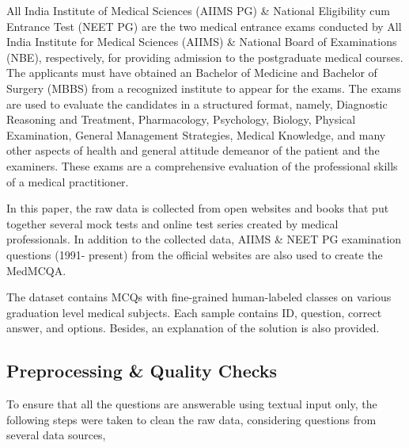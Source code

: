 \documentclass[pmlr,twocolumn,10pt]{jmlr}
\begin{document}
All India Institute of Medical Sciences (AIIMS PG) \& National Eligibility cum Entrance Test (NEET PG) are the two medical entrance exams conducted by All India Institute for Medical Sciences (AIIMS) \& National Board of Examinations (NBE), respectively, for providing admission to the postgraduate medical courses. The applicants must have obtained an Bachelor of Medicine and Bachelor of Surgery (MBBS) from a recognized institute to appear for the exams. The exams are used to evaluate the candidates in a structured format, namely, Diagnostic Reasoning and Treatment, Pharmacology, Psychology, Biology, Physical Examination, General Management Strategies, Medical Knowledge, and many other aspects of health and general attitude demeanor of the patient and the examiners. These exams are a comprehensive evaluation of the professional skills of a medical practitioner.

In this paper, the raw data is collected from open websites and books that put together several mock tests and online test series created by medical professionals. In addition to the collected data, AIIMS \& NEET PG examination questions (1991- present) from the official websites are also used to create the MedMCQA. 

The dataset contains MCQs with fine-grained human-labeled classes on various graduation level medical subjects. Each sample contains ID, question, correct answer, and options. Besides, an explanation of the solution is also provided.

\subsection{Preprocessing \& Quality Checks}
To ensure that all the questions are answerable using textual input only,
the following steps were taken to clean the raw data, considering questions from several data sources, 
\end{document}
